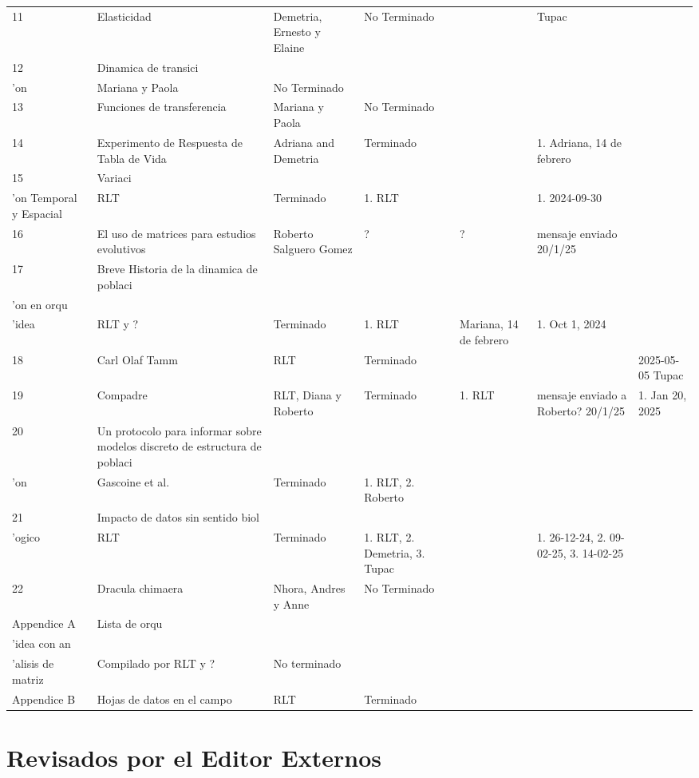 \documentclass[
  12pt,
  letterpaper,
]{book}
\begin{document}
\begin{table}
\begin{tabular*}{\linewidth}{@{\extracolsep{\fill}}lllllll}
11 & Elasticidad & Demetria, Ernesto y Elaine & No Terminado &  & Tupac &  \\ 
12 & Dinamica de transici\\'on & Mariana y Paola & No Terminado &  &  &  \\ 
13 & Funciones de transferencia & Mariana y Paola & No Terminado &  &  &  \\ 
14 & Experimento de Respuesta de Tabla de Vida & Adriana and Demetria & Terminado &  & 1. Adriana, 14 de febrero &  \\ 
15 & Variaci\\'on Temporal y Espacial & RLT & Terminado & 1. RLT &  & 1. 2024-09-30 \\ 
16 & El uso de matrices para estudios evolutivos & Roberto Salguero Gomez & ? & ? & mensaje enviado 20/1/25 &  \\ 
17 & Breve Historia de la dinamica de poblaci\\'on en orqu\\'idea & RLT y ? & Terminado & 1. RLT  & Mariana, 14 de febrero & 1. Oct 1, 2024 \\ 
18 & Carl Olaf Tamm & RLT & Terminado &  &  & 2025-05-05 Tupac \\ 
19 & Compadre & RLT, Diana y Roberto & Terminado & 1. RLT & mensaje enviado a Roberto? 20/1/25 & 1. Jan 20, 2025 \\ 
20 & Un protocolo para informar sobre modelos discreto de estructura de poblaci\\'on & Gascoine et al. & Terminado & 1.   RLT, 2. Roberto &  &  \\ 
21 & Impacto de datos sin sentido biol\\'ogico & RLT & Terminado & 1. RLT, 2. Demetria, 3. Tupac &  & 1. 26-12-24, 2. 09-02-25, 3. 14-02-25 \\ 
22 & Dracula chimaera & Nhora, Andres y Anne & No Terminado &  &  &  \\ 
Appendice A & Lista de orqu\\'idea con an\\'alisis de matriz & Compilado por RLT y ? & No terminado &  &  &  \\ 
Appendice B & Hojas de datos en el campo & RLT & Terminado &  &  &  \\ 
\bottomrule
\end{tabular*}
\end{table}

\chapter{Revisados por el Editor
Externos}\label{revisados-por-el-editor-externos}
\end{document}
